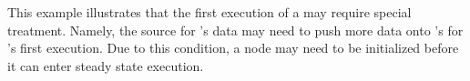 This example illustrates that the first execution of a {\filter} may
require special treatment.  Namely, the source for {\filter}'s data
may need to push more data onto {\filter}'s {\Input} {\Channel} for
{\filter}'s first execution.  Due to this condition, a {\StreamIt}
node may need to be initialized before it can enter steady state
execution.



